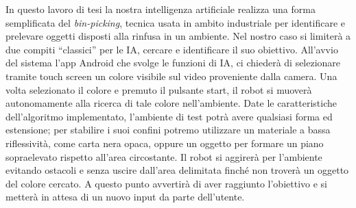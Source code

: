 In questo lavoro di tesi la nostra intelligenza artificiale realizza una forma semplificata del \emph{bin-picking},
tecnica usata in ambito industriale per identificare e prelevare oggetti 
disposti alla rinfusa in un ambiente. Nel nostro caso si limiterà a due compiti 
``classici'' per le IA, cercare e identificare 
il suo obiettivo. All'avvio del sistema l'app Android che svolge le funzioni di IA,
ci chiederà di selezionare tramite touch screen un colore visibile sul video 
proveniente dalla camera. Una volta selezionato il colore e premuto il pulsante start, 
il robot si muoverà autonomamente alla ricerca di tale colore nell'ambiente. 
Date le caratteristiche dell'algoritmo implementato, l'ambiente di test potrà 
avere qualsiasi forma ed estensione; per stabilire i suoi confini potremo utilizzare 
un materiale a bassa riflessività, come carta nera opaca, oppure un oggetto per 
formare un piano sopraelevato rispetto all'area circostante.
Il robot si aggirerà per l'ambiente evitando ostacoli e senza 
uscire dall'area delimitata finché non troverà un oggetto del colore cercato. 
A questo punto avvertirà di aver raggiunto l'obiettivo e si metterà in attesa di un nuovo 
input da parte dell'utente.